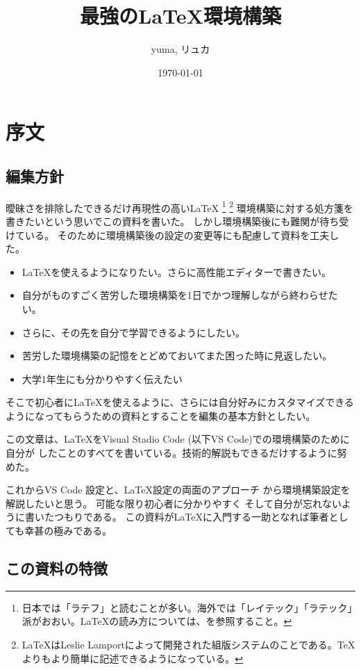 \documentclass[titlepage]{ltjsarticle}
\begin{document}
\title{最強の\LaTeX 環境構築}
\author{yuma, リュカ}
\date{\today}
\maketitle
\section{序文}
\subsection{編集方針}

曖昧さを排除したできるだけ再現性の高い\LaTeX \index{\LaTeX}
\footnote{日本では「ラテフ」と読むことが多い。海外では「レイテック」「ラテック」派がおおい。\LaTeX の読み方については、\cite{文書システムLaTeX}を参照すること。
}
\footnote{\LaTeX はLeslie Lamportによって開発された組版システムのことである。\TeX よりもより簡単に記述できるようになっている。
}
環境構築に対する処方箋を書きたいという思いでこの資料を書いた。
しかし環境構築後にも難関が待ち受けている。
そのために環境構築後の設定の変更等にも配慮して資料を工夫した。
\begin{itemize}
  \item \LaTeX を使えるようになりたい。さらに高性能エディターで書きたい。
  \item 自分がものすごく苦労した環境構築を1日でかつ理解しながら終わらせたい。
  \item さらに、その先を自分で学習できるようにしたい。
  \item 苦労した環境構築の記憶をとどめておいてまた困った時に見返したい。
  \item 大学1年生にも分かりやすく伝えたい
\end{itemize}
そこで初心者に\LaTeX を使えるように、さらには自分好みにカスタマイズできるようになってもらうための資料とすることを編集の基本方針としたい。

この文章は、\LaTeX をVisual Stadio Code (以下VS Code)での環境構築のために自分が
したことのすべてを書いている。技術的解説もできるだけするように努めた。

これからVS Code 設定と、\LaTeX 設定の両面のアプローチ
から環境構築設定を解説したいと思う。
可能な限り初心者に分かりやすく
そして自分が忘れないように書いたつもりである。
この資料が\LaTeX に入門する一助となれば筆者としても幸甚の極みである。

\subsection{この資料の特徴}
\end{document}
